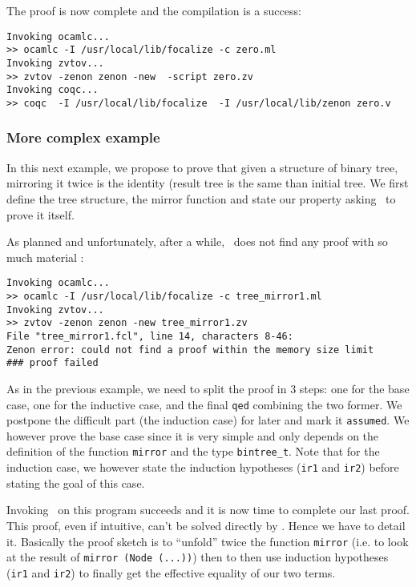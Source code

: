 \documentclass[11pt,a4paper,twoside,onecolumn,fullpage]{article}
\begin{document}
The proof is now complete and the compilation is a success:

{\scriptsize
\begin{verbatim}
Invoking ocamlc...
>> ocamlc -I /usr/local/lib/focalize -c zero.ml
Invoking zvtov...
>> zvtov -zenon zenon -new  -script zero.zv
Invoking coqc...                                                
>> coqc  -I /usr/local/lib/focalize  -I /usr/local/lib/zenon zero.v
\end{verbatim}}


\subsubsection{More complex example}
In this next example, we propose to prove that given a structure of binary
tree, mirroring it twice is the identity (result tree is the same than
initial tree. We first define the tree structure, the mirror function
and state our property asking \zenon\ to prove it itself.

{\scriptsize
}

\noindent As planned and unfortunately, after a while, \zenon\ does not find any
proof with so much material :

{\scriptsize
\begin{verbatim}
Invoking ocamlc...
>> ocamlc -I /usr/local/lib/focalize -c tree_mirror1.ml
Invoking zvtov...
>> zvtov -zenon zenon -new tree_mirror1.zv
File "tree_mirror1.fcl", line 14, characters 8-46:              
Zenon error: could not find a proof within the memory size limit
### proof failed
\end{verbatim}}

As in the previous example, we need to split the proof in 3 steps: one for the
base case, one for the inductive case, and the final \lstinline"qed" combining
the two former. We postpone the difficult part (the induction case) for later
and mark it \lstinline"assumed". We however prove the base case since it
is very simple and only depends on the definition of the function
\lstinline"mirror" and the type \lstinline"bintree_t". Note that for
the induction case, we however state the induction hypotheses (\lstinline"ir1"
and \lstinline"ir2") before stating the goal of this case.

{\scriptsize
}

Invoking \focalizec\ on this program succeeds and it is now time to
complete our last proof. This proof, even if intuitive, can't be solved
directly by \zenon. Hence we have to detail it. Basically the proof
sketch is to ``unfold'' twice the function \lstinline"mirror" (i.e. to
look at the result of \lstinline"mirror (Node (...))") then to then use induction
hypotheses (\lstinline"ir1" and \lstinline"ir2") to finally get the
effective equality of our two terms.
\end{document}
